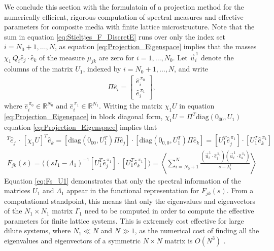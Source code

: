 \documentclass{cmslatex}
\begin{document}
We conclude this section with the formulatoin of a projection method
for the numerically efficient, rigorous computation of spectral
measures and effective parameters for composite media with finite
lattice microstructure. Note that the sum in equation
\eqref{eq:Stieltjes_F_DiscretE} runs over only the index set
$i=N_0+1,\ldots,N$, as equation \eqref{eq:Projection_Eigenspace} implies
that the masses $\chi_1\,Q_i\hat{e}_j\cdot\hat{e}_k$ of the measure $\mu_{jk}$
are zero for $i=1,\ldots,N_0$.  Let $\vec{u}_i^{\,1}$ denote the columns of
the matrix $U_1$, indexed by $i=N_0+1,\ldots,N$, and write    
%
\begin{align}\label{Pi_coordinates_E}
\Pi\hat{e}_i=
  \left[
  \begin{array}{ccc}
    \hat{e}_i^{\,\pi_0}\\
    \hat{e}_i^{\,\pi_1}
    \end{array}
\right],
\end{align}
%
where $\hat{e}_i^{\,\pi_0}\in\mathbb{R}^{N_0}$ and
$\hat{e}_i^{\,\pi_1}\in\mathbb{R}^{N_1}$. Writing the
matrix $\chi_1U$ in equation \eqref{eq:Projection_Eigenspace} in block
diagonal form, $\chi_1U=\Pi^T\text{diag}(0_{00},U_1)$ equation
\eqref{eq:Projection_Eigenspace} implies that 
%
\begin{align}
  [\chi_1U]^T\hat{e}_j\,\cdot\,[\chi_1U]^T\hat{e}_k=[\text{diag}(0_{00},U_1^T)\Pi\hat{e}_j]
                                    \cdot[\text{diag}(0_{0,0},U_1^T)\Pi\hat{e}_k]
                                   =[U_1^T\hat{e}_j^{\,\pi_1}]
                                   \cdot[U_1^T\hat{e}_k^{\,\pi_1}] 
\end{align}
%
%
\begin{align}\label{eq:Fs_U1}
  F_{jk}(s)=\langle(sI_1-\Lambda_1)^{-1}[U_1^T\hat{e}_j^{\,\pi_1}]
                       \cdot[U_1^T\hat{e}_k^{\,\pi_1}]\rangle
          =\left\langle\sum_{i=N_0+1}^N 
          \frac{
                (\vec{u}_i^{\,1}\cdot \hat{e}_j^{\,\pi_1})
               (\vec{u}_i^{\,1}\cdot \hat{e}_k^{\,\pi_1})
              }{s-\lambda_i^1}
              \right\rangle          
\end{align}
%
Equation \eqref{eq:Fs_U1} demonstrates that only the spectral
information of the matrices $U_1$ and $\Lambda_1$ appear in the functional
representation for $F_{jk}(s)$. From a computational standpoint, this
means that only the eigenvalues and eigenvectors of the $N_1\times N_1$
matrix $\Gamma_1$ need to be computed in order to compute the effective
parameters for finite lattice systems. This is extremely cost
effective for large dilute systems, where $N_1\ll N$ and $N\gg1$, as the
numerical cost of finding all the eigenvalues and eigenvectors of a
symmetric $N\times N$ matrix is $O(N^3)$ \cite{Demmel:1997}.
\end{document}
